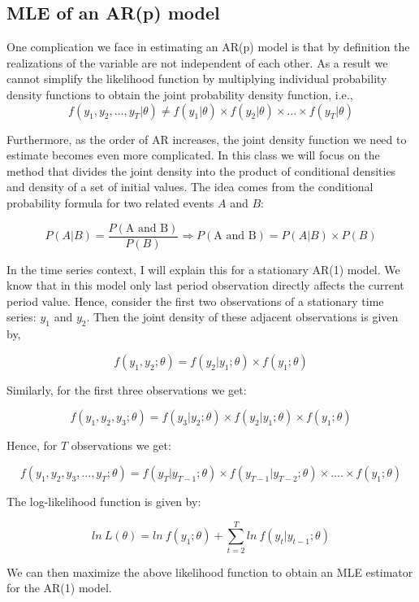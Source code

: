\documentclass[]{book}
\theoremstyle{definition}
\theoremstyle{definition}
\theoremstyle{definition}
\theoremstyle{remark}
\begin{document}
\hypertarget{mle-of-an-arp-model}{%
\subsection{MLE of an AR(p) model}\label{mle-of-an-arp-model}}

One complication we face in estimating an AR(p) model is that by definition the realizations of the variable are not independent of each other. As a result we cannot simplify the likelihood function by multiplying individual probability density functions to obtain the joint probability density function, i.e.,
\[ f(y_1,y_2,\dots,y_T|\theta) \neq f(y_1|\theta)\times f(y_2|\theta)\times \dots \times f(y_T|\theta)\]

Furthermore, as the order of AR increases, the joint density function we need to estimate becomes even more complicated. In this class we will focus on the method that divides the joint density into the product of conditional densities and density of a set of initial values. The idea comes from the conditional probability formula for two related events \(A\) and \(B\):

\[ P(A|B) =\frac{P(\text{A and B})}{P(B)} \Rightarrow P(\text{A and B}) = P(A|B)\times P(B) \]

In the time series context, I will explain this for a stationary AR(1) model. We know that in this model only last period observation directly affects the current period value. Hence, consider the first two observations of a stationary time series: \(y_1\) and \(y_2\). Then the joint density of these adjacent observations is given by,

\[ f(y_1,y_2;\theta)= f(y_2|y_1; \theta)\times f(y_1;\theta)\]

Similarly, for the first three observations we get:

\[ f(y_1,y_2,y_3;\theta)= f(y_3|y_2; \theta)\times f(y_2|y_1; \theta) \times f(y_1; \theta)\]

Hence, for \(T\) observations we get:

\[ f(y_1,y_2,y_3, ...,y_T; \theta)= f(y_T|y_{T-1};\theta)\times f(y_{T-1}|y_{T-2}; \theta)\times.... \times f(y_1; \theta)\]

The log-likelihood function is given by:

\[ ln \ L(\theta) = ln \ f(y_1;\theta) + \sum_{t=2}^{T} ln \ f(y_t|y_{t-1}; \theta)  \]

We can then maximize the above likelihood function to obtain an MLE estimator for the AR(1) model.
\end{document}
